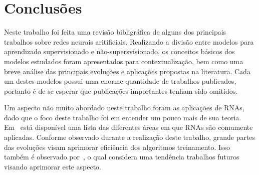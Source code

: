 \documentclass[conference]{IEEEtran}
\begin{document}
			
	\section{Conclusões}
	
	Neste trabalho foi feita uma revisão bibligráfica de alguns dos principais trabalhos sobre redes neurais aritificiais. Realizando a divisão entre modelos para aprendizado supervisionado e não-supersvisionado, os conceitos básicos dos modelos estudados foram apresentados para contextualização, bem como uma breve análise das principais evoluções e aplicações propostas na literatura. Cada um destes modelos possui uma enorme quantidade de trabalhos publicados, portanto é de se esperar que publicações importantes tenham sido omitidos.
	
	Um aspecto não muito abordado neste trabalho foram as aplicações de RNAs, dado que o foco deste trabalho foi em entender um pouco mais de sua teoria. Em~\cite{abiodun2018state} está disponível uma lista das diferentes áreas em que RNAs são comumente aplicadas. Conforme observado durante a realização deste trabalho, grande partes das evoluções visam aprimorar eficiência dos algoritmos treinamento. Isso também é observado por~\cite{abiodun2018state}, o qual considera uma tendência trabalhos futuros visando aprimorar este aspecto.


    
	
	
\end{document}
